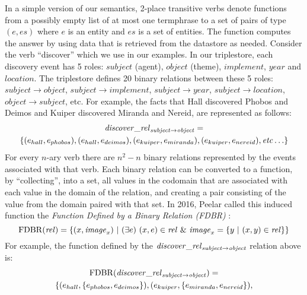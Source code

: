 \documentclass[../main.tex]{subfiles}
\begin{document}
\begin{refsection}
In a simple version of our semantics, 2-place transitive verbs denote functions from a possibly empty list of
at most one termphrase to a set of pairs of type $(e,\mathit{es})$ where $e$ is an entity and $\mathit{es}$
is a set of entities. The function computes the answer by using data that is retrieved from the datastore
as needed. Consider the verb ``discover'' which we use in our examples. In our triplestore, each
discovery event has 5 roles: $\mathit{subject}$ (agent), $\mathit{object}$ (theme), $\mathit{implement}$, $\mathit{year}$
and $\mathit{location}$. The triplestore defines 20 binary relations between these 5 roles: $\mathit{subject} \rightarrow \mathit{object}$,
$\mathit{subject} \rightarrow \mathit{implement}$, $\mathit{subject} \rightarrow \mathit{year}$, $\mathit{subject} \rightarrow \mathit{location}$, $\mathit{object} \rightarrow \mathit{subject}$, etc. For example,
the facts that Hall discovered Phobos and Deimos and Kuiper discovered Miranda and Nereid,
are represented as follows:
\begin{multline*}
	\mathit{\mathit{discover}\_rel}_{\mathit{subject} \rightarrow \mathit{object}} = \\ \{ (e_{hall}, e_{phobos}), (e_{hall}, e_{deimos}), (e_{kuiper}, e_{miranda}), (e_{kuiper}, e_{nereid}), \mathit{etc} \ldots \}
\end{multline*}
For every $n$-ary verb there are $n^2 - n$ binary relations represented by the events associated
with that verb.
Each binary relation can be converted to a function, by ``collecting'', into a set, all values
in the codomain that are associated with each value in the domain of the relation, and creating
a pair consisting of the value from the domain paired with that set. In 2016, Peelar called this induced function the {\em Function Defined by a Binary Relation (FDBR)} \cite{peelar2016accommodating}:
\begin{equation*}
	\FDBR{\mathit{rel}} = \{(x, \mathit{image}_x)\ |\ (\exists e)\ (x, e) \in \mathit{rel}\ \&\ \mathit{image}_x = \{ y\ |\ (x, y) \in \mathit{rel} \}  \}
\end{equation*}
For example, the function defined by the $\mathit{discover\_rel}_{\mathit{subject} \rightarrow \mathit{object}}$ relation above is:
\begin{multline*}
	\FDBR{\relation{discover}_{\mathit{subject} \rightarrow \mathit{object}}} = \\ \{ (\entityassoc{hall}, \{\entityassoc{phobos}, \entityassoc{deimos}\}), (\entityassoc{kuiper}, \{ \entityassoc{miranda}, \entityassoc{nereid} \}),

\end{multline*}
\end{refsection}
\end{document}
